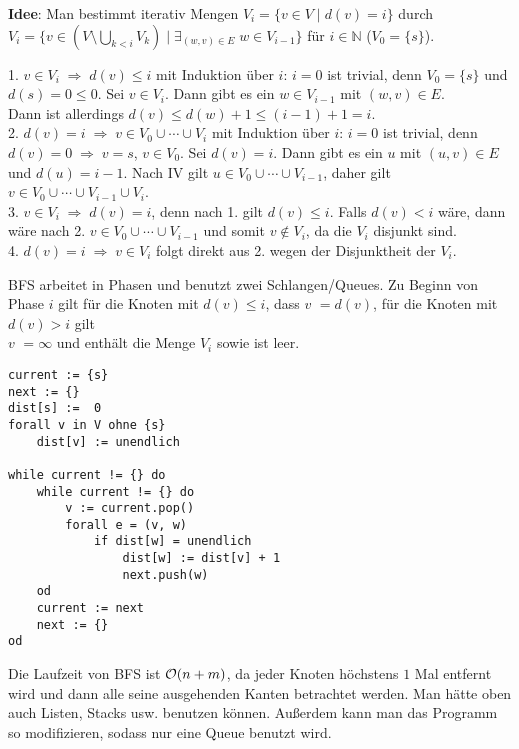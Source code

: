 \textbf{Idee}:
Man bestimmt iterativ Mengen $V_i = \{v \in V \;|\; d(v) = i\}$ durch \\
$V_i = \{v \in (V \setminus \bigcup_{k < i} V_k) \;|\;
\exists_{(w,v) \in E}\; w \in V_{i-1}\}$ für $i \in \mathbb{N}$
($V_0 = \{s\}$).

\begin{Beweis}
    1. $v \in V_i \;\Rightarrow\; d(v) \le i$ mit Induktion über $i$:
    $i = 0$ ist trivial, denn $V_0 = \{s\}$ und $d(s) = 0 \le 0$.
    Sei $v \in V_i$.
    Dann gibt es ein $w \in V_{i-1}$ mit $(w, v) \in E$. \\
    Dann ist allerdings $d(v) \le d(w) + 1 \le (i - 1) + 1 = i$. \\
    2. $d(v) = i \;\Rightarrow\; v \in V_0 \cup \dotsb \cup V_i$ mit Induktion
    über $i$:
    $i = 0$ ist trivial, denn $d(v) = 0 \;\Rightarrow\; v = s$, $v \in V_0$.
    Sei $d(v) = i$.
    Dann gibt es ein $u$ mit $(u, v) \in E$ und $d(u) = i - 1$.
    Nach IV gilt $u \in V_0 \cup \dotsb \cup V_{i-1}$, daher gilt
    $v \in V_0 \cup \dotsb \cup V_{i-1} \cup V_i$. \\
    3. $v \in V_i \;\Rightarrow\; d(v) = i$, denn nach 1. gilt
    $d(v) \le i$. Falls $d(v) < i$ wäre, dann wäre nach 2.
    $v \in V_0 \cup \dotsb \cup V_{i-1}$ und somit $v \notin V_i$,
    da die $V_i$ disjunkt sind. \\
    4. $d(v) = i \;\Rightarrow\; v \in V_i$ folgt direkt aus 2. wegen der
    Disjunktheit der $V_i$.
\end{Beweis}

\linie

BFS arbeitet in Phasen und benutzt zwei Schlangen/Queues.
Zu Beginn von Phase $i$ gilt für die Knoten mit $d(v) \le i$, dass
\code{dist[}$v$\code{]} $= d(v)$, für die Knoten mit $d(v) > i$ gilt \\
\code{dist[}$v$\code{]} $= \infty$ und  enthält die Menge
$V_i$ sowie  ist leer.

\begin{lstlisting}
current := {s}
next := {}
dist[s] :=  0
forall v in V ohne {s}
    dist[v] := unendlich

while current != {} do
    while current != {} do
        v := current.pop()
        forall e = (v, w)
            if dist[w] = unendlich
                dist[w] := dist[v] + 1
                next.push(w)
    od
    current := next
    next := {}
od
\end{lstlisting}

Die Laufzeit von BFS ist $\mathcal{O}(n + m)$, da jeder Knoten höchstens $1$ Mal
entfernt wird und dann alle seine ausgehenden Kanten betrachtet werden.
Man hätte oben auch Listen, Stacks usw. benutzen können.
Außerdem kann man das Programm so modifizieren, sodass nur eine
Queue benutzt wird.

